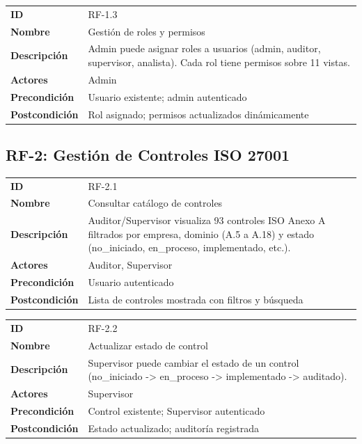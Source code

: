 \documentclass[12pt,a4paper,oneside]{article}
\begin{document}
\begin{tabularx}{\linewidth}{|l|X|}
\hline
\textbf{ID} & RF-1.3 \\
\textbf{Nombre} & Gestión de roles y permisos \\
\textbf{Descripción} & Admin puede asignar roles a usuarios (admin, auditor, supervisor, analista). Cada rol tiene permisos sobre 11 vistas. \\
\textbf{Actores} & Admin \\
\textbf{Precondición} & Usuario existente; admin autenticado \\
\textbf{Postcondición} & Rol asignado; permisos actualizados dinámicamente \\
\hline
\end{tabularx}

\subsection{RF-2: Gestión de Controles ISO 27001}

\begin{tabularx}{\linewidth}{|l|X|}
\hline
\textbf{ID} & RF-2.1 \\
\textbf{Nombre} & Consultar catálogo de controles \\
\textbf{Descripción} & Auditor/Supervisor visualiza 93 controles ISO Anexo A filtrados por empresa, dominio (A.5 a A.18) y estado (no_iniciado, en_proceso, implementado, etc.). \\
\textbf{Actores} & Auditor, Supervisor \\
\textbf{Precondición} & Usuario autenticado \\
\textbf{Postcondición} & Lista de controles mostrada con filtros y búsqueda \\
\hline
\end{tabularx}

\begin{tabularx}{\linewidth}{|l|X|}
\hline
\textbf{ID} & RF-2.2 \\
\textbf{Nombre} & Actualizar estado de control \\
\textbf{Descripción} & Supervisor puede cambiar el estado de un control (no_iniciado -> en_proceso -> implementado -> auditado). \\
\textbf{Actores} & Supervisor \\
\textbf{Precondición} & Control existente; Supervisor autenticado \\
\textbf{Postcondición} & Estado actualizado; auditoría registrada \\
\hline
\end{tabularx}
\end{document}
